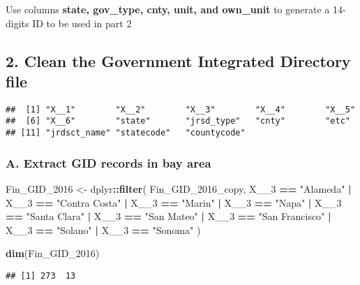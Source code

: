\documentclass[]{article}
\newenvironment{Shaded}{\begin{snugshade}}{\end{snugshade}}
\newcommand{\KeywordTok}[1]{\textcolor[rgb]{0.13,0.29,0.53}{\textbf{#1}}}
\newcommand{\DecValTok}[1]{\textcolor[rgb]{0.00,0.00,0.81}{#1}}
\newcommand{\StringTok}[1]{\textcolor[rgb]{0.31,0.60,0.02}{#1}}
\newcommand{\OperatorTok}[1]{\textcolor[rgb]{0.81,0.36,0.00}{\textbf{#1}}}
\newcommand{\NormalTok}[1]{#1}
\begin{document}
Use columns \textbf{state, gov\_type, cnty, unit, and own\_unit} to
generate a 14-digits ID to be used in part 2

\subsection{2. Clean the Government Integrated Directory
file}\label{clean-the-government-integrated-directory-file}

\begin{verbatim}
##  [1] "X__1"        "X__2"        "X__3"        "X__4"        "X__5"       
##  [6] "X__6"        "state"       "jrsd_type"   "cnty"        "etc"        
## [11] "jrdsct_name" "statecode"   "countycode"
\end{verbatim}

\subsubsection{A. Extract GID records in bay
area}\label{a.-extract-gid-records-in-bay-area}

\begin{Shaded}
\begin{Highlighting}[]
\NormalTok{Fin_GID_}\DecValTok{2016}\NormalTok{ <-}
\StringTok{  }\NormalTok{dplyr}\OperatorTok{::}\KeywordTok{filter}\NormalTok{(}
\NormalTok{  Fin_GID_2016_copy,}
\NormalTok{  X__}\DecValTok{3} \OperatorTok{==}\StringTok{ "Alameda"} \OperatorTok{|}
\StringTok{  }\NormalTok{X__}\DecValTok{3} \OperatorTok{==}\StringTok{ "Contra Costa"} \OperatorTok{|}
\StringTok{  }\NormalTok{X__}\DecValTok{3} \OperatorTok{==}\StringTok{ "Marin"} \OperatorTok{|}
\StringTok{  }\NormalTok{X__}\DecValTok{3} \OperatorTok{==}\StringTok{ "Napa"} \OperatorTok{|}
\StringTok{  }\NormalTok{X__}\DecValTok{3} \OperatorTok{==}\StringTok{ "Santa Clara"} \OperatorTok{|}
\StringTok{  }\NormalTok{X__}\DecValTok{3} \OperatorTok{==}\StringTok{ "San Mateo"} \OperatorTok{|}
\StringTok{  }\NormalTok{X__}\DecValTok{3} \OperatorTok{==}\StringTok{ "San Francisco"} \OperatorTok{|}\StringTok{ }\NormalTok{X__}\DecValTok{3} \OperatorTok{==}\StringTok{ "Solano"} \OperatorTok{|}\StringTok{ }\NormalTok{X__}\DecValTok{3} \OperatorTok{==}\StringTok{ "Sonoma"}
\NormalTok{  )}

\KeywordTok{dim}\NormalTok{(Fin_GID_}\DecValTok{2016}\NormalTok{)}
\end{Highlighting}
\end{Shaded}

\begin{verbatim}
## [1] 273  13
\end{verbatim}
\end{document}

